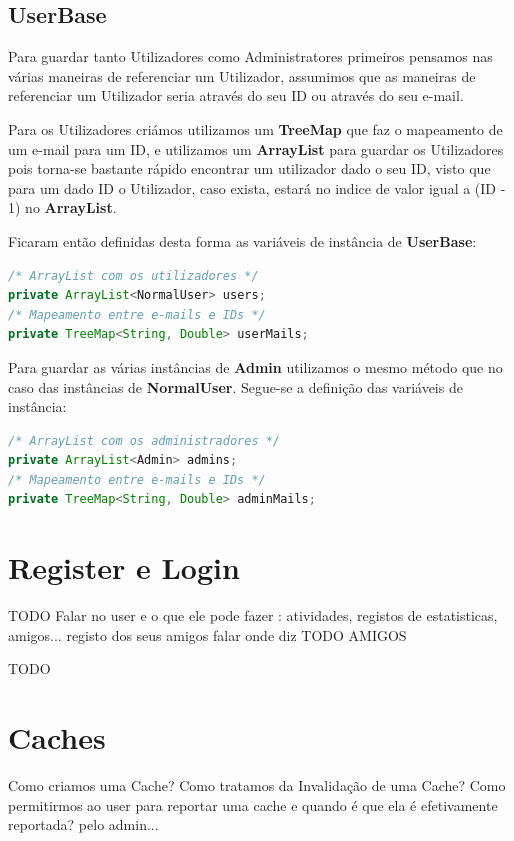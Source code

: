 \documentclass{article}
\begin{document}
\subsection{UserBase}
\par Para guardar tanto Utilizadores como Administratores primeiros pensamos nas várias maneiras de referenciar um 
Utilizador, assumimos que as maneiras de referenciar um Utilizador seria através do seu ID ou através do seu e-mail.
\par Para os Utilizadores criámos utilizamos um \textbf{TreeMap} que faz o mapeamento de um e-mail para um ID, e 
utilizamos um \textbf{ArrayList} para guardar os Utilizadores pois torna-se bastante rápido encontrar um utilizador dado o
seu ID, visto que para um dado ID o Utilizador, caso exista, estará no indice de valor igual a (ID - 1) no \textbf{ArrayList}.
\par Ficaram então definidas desta forma as variáveis de instância de \textbf{UserBase}:
\begin{lstlisting}[language=Java]
/* ArrayList com os utilizadores */
private ArrayList<NormalUser> users;
/* Mapeamento entre e-mails e IDs */
private TreeMap<String, Double> userMails;
\end{lstlisting}

\par Para guardar as várias instâncias de \textbf{Admin} utilizamos o mesmo método que no caso das instâncias de
\textbf{NormalUser}. Segue-se a definição das variáveis de instância:
\begin{lstlisting}[language=Java]
/* ArrayList com os administradores */
private ArrayList<Admin> admins;
/* Mapeamento entre e-mails e IDs */
private TreeMap<String, Double> adminMails;
\end{lstlisting}










\pagebreak
\section{Register e Login}
TODO
Falar no user e o que ele pode fazer : atividades, registos de estatisticas, amigos...
registo dos seus amigos falar onde diz TODO AMIGOS






\pagebreak

TODO
\section{ Caches }
Como criamos uma Cache?
Como tratamos da Invalidação de uma Cache?
Como permitirmos ao user para reportar uma cache e quando é que ela é efetivamente reportada? pelo admin... 
\end{document}
